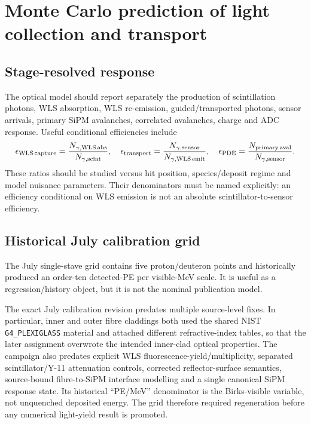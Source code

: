\section{Monte Carlo prediction of light collection and transport}

\subsection{Stage-resolved response}

The optical model should report separately the production of scintillation photons, WLS absorption, WLS re-emission, guided/transported photons, sensor arrivals, primary SiPM avalanches, correlated avalanches, charge and ADC response. Useful conditional efficiencies include
\[
\epsilon_{\rm WLS\,capture}=\frac{N_{\gamma,\rm WLS\,abs}}{N_{\gamma,\rm scint}},\quad
\epsilon_{\rm transport}=\frac{N_{\gamma,\rm sensor}}{N_{\gamma,\rm WLS\,emit}},\quad
\epsilon_{\rm PDE}=\frac{N_{\rm primary\,aval}}{N_{\gamma,\rm sensor}}.
\]
These ratios should be studied versus hit position, species/deposit regime and model nuisance parameters. Their denominators must be named explicitly: an efficiency conditional on WLS emission is not an absolute scintillator-to-sensor efficiency.

\subsection{Historical July calibration grid}

The July single-stave grid contains five proton/deuteron points and historically produced an order-ten detected-PE per visible-MeV scale. It is useful as a regression/history object, but it is not the nominal publication model.

\begin{publicationhold}
The exact July calibration revision predates multiple source-level fixes. In particular, inner and outer fibre claddings both used the shared NIST \texttt{G4\_PLEXIGLASS} material and attached different refractive-index tables, so that the later assignment overwrote the intended inner-clad optical properties. The campaign also predates explicit WLS fluorescence-yield/multiplicity, separated scintillator/Y-11 attenuation controls, corrected reflector-surface semantics, source-bound fibre-to-SiPM interface modelling and a single canonical SiPM response state. Its historical ``PE/MeV'' denominator is the Birks-visible variable, not unquenched deposited energy. The grid therefore required regeneration before any numerical light-yield result is promoted.
\end{publicationhold}

